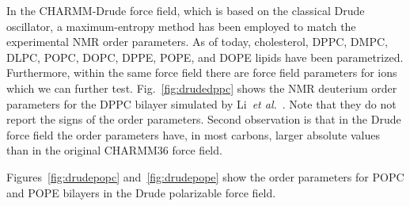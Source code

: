 \documentclass[journal=jpcbfk,manuscript=article,layout=twocolumn]{achemso}
\begin{document}
In the CHARMM-Drude force field, which is based on the classical Drude oscillator, a
maximum-entropy method has been employed to match the experimental NMR order
parameters. As of today, cholesterol, DPPC, DMPC, DLPC, POPC, DOPC, DPPE, POPE, and DOPE
lipids have been parametrized. Furthermore, within the same force field there
are force field parameters for ions which we can further test. Fig.~\ref{fig:drudedppc} shows the NMR deuterium order parameters for the DPPC bilayer simulated by Li~\textit{et al.}~\cite{li2017drude}.
Note that they do not report the signs of the order parameters.
Second observation is that in the Drude force
field the order parameters have, in most carbons, larger absolute values than in the original
CHARMM36 force field.

Figures~\ref{fig:drudepopc} and~\ref{fig:drudepope} show
the order parameters for POPC and POPE bilayers
in the Drude polarizable force field.
\end{document}
